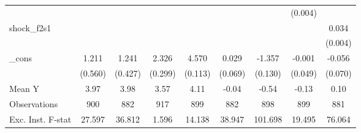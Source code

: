 {\begin{tabular}{l*{8}{c}}
            &                     &                     &                     &                     &                     &                     &     (0.004)         &                     \\
\addlinespace
shock\_f2s1  &                     &                     &                     &                     &                     &                     &                     &       0.034\sym{***}\\
            &                     &                     &                     &                     &                     &                     &                     &     (0.004)         \\
\addlinespace
\_cons      &       1.211\sym{**} &       1.241\sym{***}&       2.326\sym{***}&       4.570\sym{***}&       0.029         &      -1.357\sym{***}&      -0.001         &      -0.056         \\
            &     (0.560)         &     (0.427)         &     (0.299)         &     (0.113)         &     (0.069)         &     (0.130)         &     (0.049)         &     (0.070)         \\
\midrule
Mean Y      &        3.97         &        3.98         &        3.57         &        4.11         &       -0.04         &       -0.54         &       -0.13         &        0.10         \\
Observations&         900         &         882         &         917         &         899         &         882         &         898         &         899         &         881         \\
Exc. Inst. F-stat&      27.597         &      36.812         &       1.596         &      14.138         &      38.947         &     101.698         &      19.495         &      76.064         \\
\bottomrule
\end{tabular}
}
